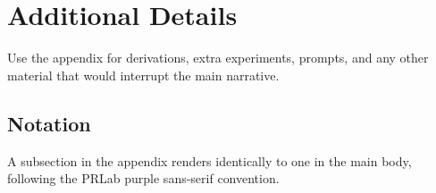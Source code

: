\section{Additional Details}
\label{app:details}

Use the appendix for derivations, extra experiments, prompts, and any other
material that would interrupt the main narrative.

\subsection{Notation}

A subsection in the appendix renders identically to one in the main body,
following the PRLab purple sans-serif convention.
